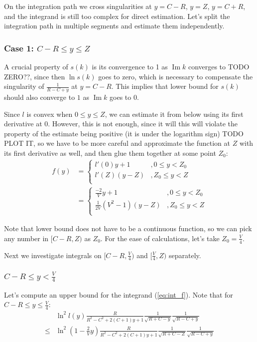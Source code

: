 \documentclass[12pt, a4paper]{article}
\theoremstyle{plain}
\renewcommand{\Im}{\operatorname{Im}}
\begin{document}
On the integration path we cross singularities at $y = C - R$, $y = Z$, $y = C + R$, and the integrand is still too complex for direct estimation. Let's split the integration path in multiple segments and estimate them independently.

\subsubsection{Case 1: $C - R \le y \le Z$}
A crucial property of $s(k)$ is its convergence to 1 as $\Im k$ converges to TODO ZERO??, since then $\ln s(k)$ goes to zero, which is necessary to compensate the singularity of $\frac{1}{R - C + y}$ at $y = C - R$. 
This implies that lower bound for $s(k)$ should also converge to $1$ as $\Im k$ goes to $0$.

Since $l$ is convex when $0 \le y \le Z$, we can estimate it from below using its first derivative at $0$. However, this is not enough, since it will this will violate the property of the estimate being positive (it is under the logarithm sign) TODO PLOT IT, so we have to be more careful and approximate the function at $Z$ with its first derivative as well, and then glue them together at some point $Z_0$:
\begin{align*}
f(y)
& = 
\begin{cases}
l'(0) y + 1   &, 0 \le y < Z_0  \\
l'(Z) (y - Z) &, Z_0 \le y < Z \\
\end{cases}
\\
& =
\begin{cases}
\frac{-2}{V} y + 1   &, 0 \le y < Z_0  \\
\frac{1}{2 V}(V^2 - 1) (y - Z) &, Z_0 \le y < Z \\
\end{cases}
\end{align*}

Note that lower bound does not have to be a continuous function, so we can pick any number in $[C - R, Z)$ as $Z_0$. For the ease of calculations, let's take $Z_0 = \frac{V}{4}$.  %

Next we investigate integrals on $[C - R, \frac{V}{4})$ and $[\frac{V}{4}, Z)$ separately.

\subsubsection{$C - R \le y < \frac{V}{4}$}

Let's compute an upper bound for the integrand (\ref{eq:int_f}). Note that for $C - R \le y \le \frac{V}{4}$:
\begin{align*}
       & \ln^2 l(y) \frac{R}{R^2 - C^2 + 2 (C + 1) y + 1} \frac{1}{\sqrt{R + C - y}} \frac{1}{\sqrt{R - C + y}}
\\ \le & \ln^2 (1 - \frac{2}{V} y) \frac{R}{R^2 - C^2 + 2 (C + 1) y + 1} \frac{1}{\sqrt{R + C - Z}} \frac{1}{\sqrt{R - C + y}}
\end{align*}
\end{document}

